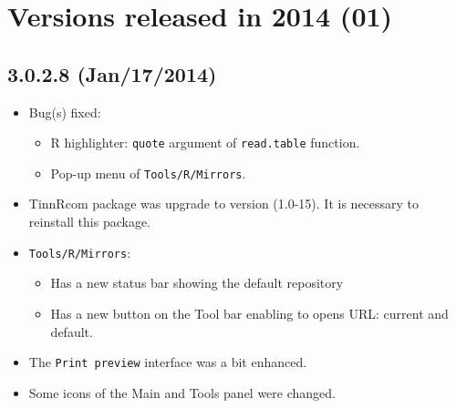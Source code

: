 
\section{Versions released in 2014 (01)}
\subsection{3.0.2.8 (Jan/17/2014)}
\begin{itemize}
  \item Bug(s) fixed:
    \begin{itemize}
      \item R highlighter: \texttt{quote} argument of \texttt{read.table} function.
      \item Pop-up menu of \texttt{Tools/R/Mirrors}.
    \end{itemize}
  \item TinnRcom package was upgrade to version (1.0-15).
   It is necessary to reinstall this package.
  \item \texttt{Tools/R/Mirrors}:
    \begin{itemize}
       \item Has a new status bar showing the default repository
       \item Has a new button on the Tool bar enabling to opens URL: current and default.
    \end{itemize}
  \item The \texttt{Print preview} interface was a bit enhanced.
  \item Some icons of the Main and Tools panel were changed.
\end{itemize}
